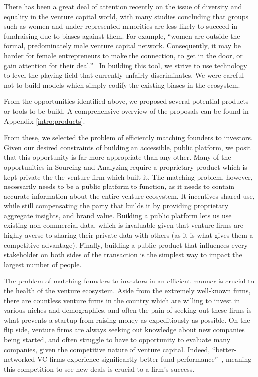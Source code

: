 There has been a great deal of attention recently on the issue of diversity and equality in the venture capital world, with many studies concluding that groups such as women and under-represented minorities are less likely to succeed in fundraising due to biases against them. For example, ``women are outside the formal, predominately male venture capital network. Consequently, it may be harder for female entrepreneurs to make the connection, to get in the door, or gain attention for their deal.''~\cite{doi:10.1080/13691060118175} In building this tool, we strive to use technology to level the playing field that currently unfairly discriminates. We were careful not to build models which simply codify the existing biases in the ecosystem.

From the opportunities identified above, we proposed several potential products or tools to be build. A comprehensive overview of the proposals can be found in Appendix \ref{intro:products}.

From these, we selected the problem of efficiently matching founders to investors. Given our desired constraints of building an accessible, public platform, we posit that this opportunity is far more appropriate than any other. Many of the opportunities in Sourcing and Analyzing require a proprietary product which is kept private the the venture firm which built it. The matching problem, however, necessarily needs to be a public platform to function, as it needs to contain accurate information about the entire venture ecosystem. It incentives shared use, while still compensating the party that builds it by providing proprietary aggregate insights, and brand value. Building a public platform lets us use existing non-commercial data, which is invaluable given that venture firms are highly averse to sharing their private data with others (as it is what gives them a competitive advantage). Finally, building a public product that influences every stakeholder on both sides of the transaction is the simplest way to impact the largest number of people.

The problem of matching founders to investors in an efficient manner is crucial to the health of the venture ecosystem. Aside from the extremely well-known firms, there are countless venture firms in the country which are willing to invest in various niches and demographics, and often the pain of seeking out these firms is what prevents a startup from raising money as expeditiously as possible. On the flip side, venture firms are always seeking out knowledge about new companies being started, and often struggle to have to opportunity to evaluate many companies, given the competitive nature of venture capital. Indeed, ``better‐networked VC firms experience significantly better fund performance''~\cite{doi:10.1111/j.1540-6261.2007.01207.x}, meaning this competition to see new deals is crucial to a firm's success.

